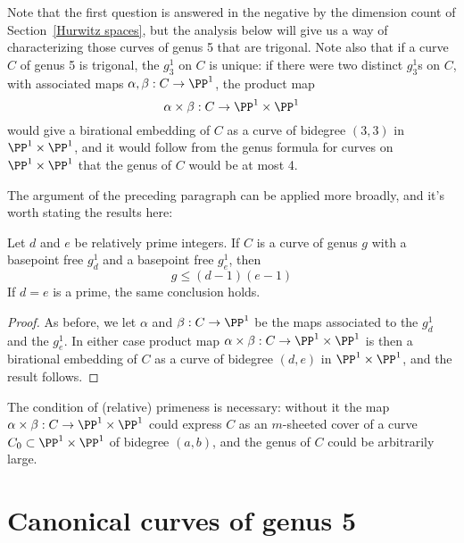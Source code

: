 Note that the first question is answered in the negative by the dimension count of Section~\ref{Hurwitz spaces}, but the analysis below will give us a way of characterizing those curves of genus 5 that are trigonal. Note also that if a curve $C$ of genus 5 is trigonal, the $g^1_3$ on $C$ is unique: if there were two distinct $g^1_3$s on $C$, with associated maps $\alpha, \beta : C \to \PP^1$, the product map
$$
\alpha \times \beta : C \to \PP^1 \times \PP^1
$$
would give a birational embedding of $C$ as a curve of bidegree $(3,3)$ in $\PP^1 \times \PP^1$, and it would follow from the genus formula for curves on $\PP^1 \times \PP^1$ that the genus of $C$ would be at most 4. 

The argument of the preceding paragraph can be applied more broadly, and it's worth stating the results here:

\begin{proposition}
Let $d$ and $e$ be relatively prime integers. If $C$ is a curve of genus $g$ with a basepoint free $g^1_d$ and a basepoint free $g^1_e$, then
$$
g \leq (d-1)(e-1)
$$
If $d = e$ is a prime, the same conclusion holds.
\end{proposition}

\begin{proof}
As before, we let $\alpha$ and $\beta : C \to \PP^1$ be the maps associated to the $g^1_d$ and the $g^1_e$. In either case product map $\alpha \times \beta : C \to \PP^1 \times \PP^1$ is then a birational embedding of $C$ as a curve of bidegree $(d,e)$ in $\PP^1 \times \PP^1$, and the result follows.
\end{proof}

The condition of (relative) primeness is necessary: without it the map $\alpha \times \beta : C \to \PP^1 \times \PP^1$ could express $C$ as an $m$-sheeted cover of a curve $C_0 \subset \PP^1 \times \PP^1$ of bidegree $(a,b)$, and the genus of $C$ could be arbitrarily large.


\section{Canonical curves of genus 5}

